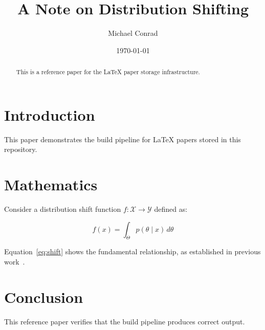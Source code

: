 \documentclass{article}
\title{A Note on Distribution Shifting}
\author{Michael Conrad}
\date{\today}
\begin{document}
\maketitle

\begin{abstract}
This is a reference paper for the LaTeX paper storage infrastructure.
\end{abstract}

\section{Introduction}

This paper demonstrates the build pipeline for LaTeX papers stored in this repository.

\section{Mathematics}

Consider a distribution shift function $f: \mathcal{X} \to \mathcal{Y}$ defined as:

\begin{equation}
f(x) = \int_{\Theta} p(\theta \mid x) \, d\theta
\label{eq:shift}
\end{equation}

Equation~\ref{eq:shift} shows the fundamental relationship, as established in previous work~\cite{example2024}.

\section{Conclusion}

This reference paper verifies that the build pipeline produces correct output.



\end{document}
